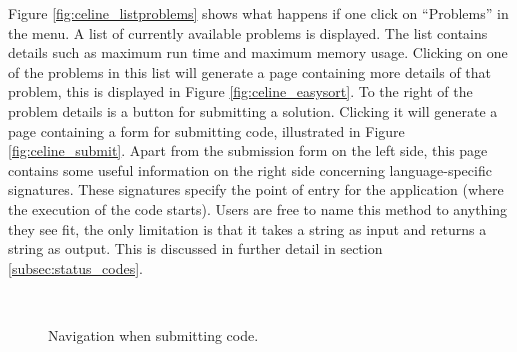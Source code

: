 Figure \ref{fig:celine_listproblems} shows what happens if one click on ``Problems'' in the menu. A list of currently available problems is displayed. The list contains details such as maximum run time and maximum memory usage. Clicking on one of the problems in this list will generate a page containing more details of that problem, this is displayed in Figure \ref{fig:celine_easysort}. To the right of the problem details is a button for submitting a solution. Clicking it will generate a page containing a form for submitting code, illustrated in Figure \ref{fig:celine_submit}. Apart from the submission form on the left side, this page contains some useful information on the right side concerning language-specific signatures. These signatures specify the point of entry for the application (where the execution of the code starts). Users are free to name this method to anything they see fit, the only limitation is that it takes a string as input and returns a string as output. This is discussed in further detail in section \ref{subsec:status_codes}.

\begin{figure}[h]
\centering
\mbox{
}
\caption{Navigation when submitting code.}
\label{fig:celine_split_submit_submissions}
\end{figure}

